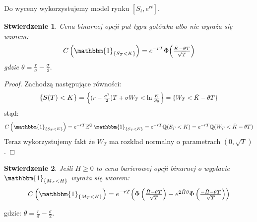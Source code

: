 \documentclass[11pt]{report}
\newtheorem{stw}{Stwierdzenie}[chapter]
\newcommand*{\Scale}[2][4]{\scalebox{#1}{$#2$}}%
\begin{document}
Do wyceny wykorzystujemy model rynku $[S_t,e^{rt}]$.

\begin{stw} Cena binarnej opcji put typu gotówka albo nic wyraża się wzorem:
\begin{equation*}
C\left( \mathbbm{1}_{ \{ S_T<K \} } \right) =  e^{-rT}\Phi \Scale[1.0]{  \left( \frac{ \tilde{K} - \theta T}{\sqrt{T}} \right) }
\end{equation*} gdzie $\theta = \frac{r}{\sigma} - \frac{\sigma}{2}.$
\end{stw}



\begin{proof}
Zachodzą następujące równości:
\begin{equation*}	
	\{ S(T) < K \} = \Scale[0.9]{\Big\{ (r - \frac{\sigma^2}{2})T + \sigma W_T < \ln \frac{K}{S_0} \Big\} = \{ W_T < \tilde{K} - \theta T \}}
\end{equation*}	
stąd:
\begin{equation*}
C\left (\mathbbm{1}_{ \{ S_T<K \} } \right) = e^{-rT}\mathbb{E}^{\mathbb{Q}} \, \mathbbm{1}_{ \{ S_T<K \} } = e^{-rT}\mathbb{Q}(S_T < K) = e^{-rT}\mathbb{Q}(W_T < \tilde{K} - \theta T)
\end{equation*}
Teraz wykorzystujemy fakt że $W_T$ ma rozkład normalny o parametrach $(0,\sqrt{T})$.

\end{proof}

\begin{stw} Jeśli $H \ge 0$ to cena barierowej opcji binarnej o wypłacie $\mathbbm{1}_{ \{ M_T<H \} }$ wyraża się wzorem:
\begin{equation*}
C\left( \mathbbm{1}_{ \{ M_T<H \} } \right) = e^{-rT}\Scale[1.0]{\left(\Phi\left(\frac{ \tilde{H}-\theta T }{\sqrt{T}} \right) - e^{2\tilde{H}\theta}\Phi\left(\frac{ -\tilde{H}-\theta T }{\sqrt{T}} \right) \right) }
\end{equation*}
\end{stw}
gdzie: $\theta = \frac{r}{\sigma} - \frac{\sigma}{2}.  $ 
\end{document}

